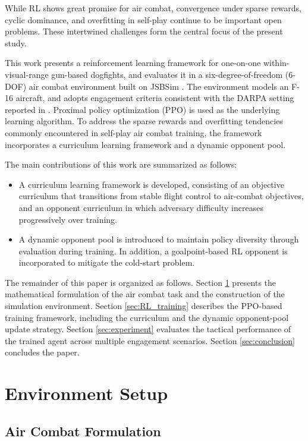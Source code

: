 \documentclass[pdflatex,sn-mathphys-num]{sn-jnl}%
\theoremstyle{thmstyleone}%
\theoremstyle{thmstyletwo}%
\theoremstyle{thmstylethree}%
\begin{document}
While RL shows great promise for air combat, convergence under sparse rewards, cyclic dominance, and overfitting in self-play continue to be important open problems. These intertwined challenges form the central focus of the present study.

This work presents a reinforcement learning framework for one-on-one within-visual-range gun-based dogfights, and evaluates it in a six-degree-of-freedom (6-DOF) air combat environment built on JSBSim \cite{jsbsim}. The environment models an F-16 aircraft, and adopts engagement criteria consistent with the DARPA setting reported in \cite{pope_hierarchical_2023}. Proximal policy optimization (PPO) is used as the underlying learning algorithm. To address the sparse rewards and overfitting tendencies commonly encountered in self-play air combat training, the framework incorporates a curriculum learning framework and a dynamic opponent pool.

The main contributions of this work are summarized as follows:
\begin{itemize}
    \item A curriculum learning framework is developed, consisting of an objective curriculum that transitions from stable flight control to air-combat objectives, and an opponent curriculum in which adversary difficulty increases progressively over training.
    \item A dynamic opponent pool is introduced to maintain policy diversity through evaluation during training. In addition, a goalpoint-based RL opponent is incorporated to mitigate the cold-start problem.
\end{itemize}

The remainder of this paper is organized as follows. Section \ref{sec:env_setup} presents the mathematical formulation of the air combat task and the construction of the simulation environment. Section \ref{sec:RL_training} describes the PPO-based training framework, including the curriculum and the dynamic opponent-pool update strategy. Section \ref{sec:experiment} evaluates the tactical performance of the trained agent across multiple engagement scenarios. Section \ref{sec:conclusion} concludes the paper.

\section{Environment Setup}
\label{sec:env_setup}

\subsection{Air Combat Formulation}
\label{sec:mdp_modeling}
\end{document}
